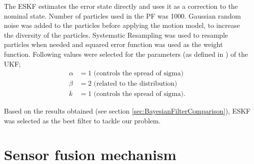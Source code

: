 The \gls{ESKF} estimates the error state directly and uses it as a correction to the nominal state. Number of particles used in the \gls{PF} was 1000. Gaussian random noise was added to the particles before applying the motion model, to increase the diversity of the particles. Systematic Resampling was used to resample particles when needed and squared error function was used as the weight function. Following values were selected for the parameters (as defined in \cite{ch26:wan2000unscented}) of the \gls{UKF};
\begin{align}
	\alpha &= 1 \text{ (controls the spread of sigma)}\\
	\beta & = 2 \text{ (related to the distribution)}\\
	k &= 1 \text{ (controls the spread of sigma)}.
\end{align}

Based on the results obtained (see section \ref{sec:BayesianFilterComparison}), \gls{ESKF} was selected as the best filter to tackle our problem.









\section{Sensor fusion mechanism}

